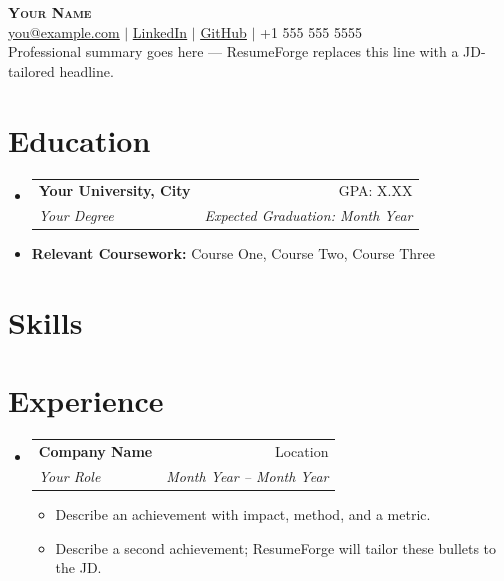 \documentclass[letterpaper,10pt]{article}
\makeatletter
\newcommand{\resumeItem}[1]{
  \item{\small\setlength{\baselineskip}{10pt} #1 \vspace{-2pt}}
}
\newcommand{\resumeSubheading}[4]{
  \vspace{-2pt}\item
    \begin{tabular*}{\textwidth}[t]{@{}p{0.75\textwidth}@{\extracolsep{\fill}}r@{}}
      \textbf{#1} & \small #2 \\
      \textit{\small#3} & \textit{\small #4} \\
    \end{tabular*}\vspace{-4pt}
}
\newcommand{\resumeSubHeadingListStart}{\begin{itemize}[leftmargin=0in, label={}, topsep=0pt, partopsep=0pt]}
\newcommand{\resumeSubHeadingListEnd}{\end{itemize}}
\newcommand{\resumeItemListStart}{\begin{itemize}[leftmargin=0.15in, label={\color{accent}$\bullet$}, topsep=0pt, partopsep=0pt, itemsep=3pt, parsep=0pt]}
\newcommand{\resumeItemListEnd}{\end{itemize}}
\makeatother
\begin{document}
\fontsize{10.5}{11}\selectfont
\begin{center}
    {\Huge \scshape \textbf{\color{accent}Your Name}} \\ \vspace{4pt}
    \href{mailto:you@example.com}{\ul{you@example.com}} $|$
    \href{https://www.linkedin.com/in/your-handle/}{\ul{LinkedIn}} $|$
    \href{https://github.com/your-handle}{\ul{GitHub}} $|$
    +1 555 555 5555
    \\ \vspace{6pt}
    {Professional summary goes here — ResumeForge replaces this line with a JD-tailored headline.}
\end{center}
\section{Education}
\resumeSubHeadingListStart
  \resumeSubheading
    {Your University, City}{GPA: X.XX}
    {Your Degree}{\textit{Expected Graduation: Month Year}}  \vspace{-9pt}
  \item \small{\textbf{Relevant Coursework:} Course One, Course Two, Course Three}
\resumeSubHeadingListEnd
\section{Skills}
\begin{itemize}[leftmargin=0in, label={}, topsep=0pt, partopsep=0pt]
  \small{\item{
  }}
\end{itemize}
\section{Experience}
\resumeSubHeadingListStart
  \resumeSubheading
    {Company Name}{Location}
    {Your Role}{Month Year -- Month Year}
    \resumeItemListStart
      \resumeItem{Describe an achievement with impact, method, and a metric.}
      \resumeItem{Describe a second achievement; ResumeForge will tailor these bullets to the JD.}
    \resumeItemListEnd
\resumeSubHeadingListEnd
\end{document}
